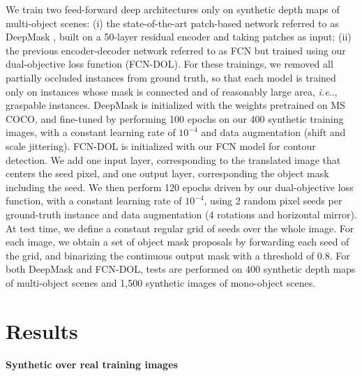 \documentclass[runningheads,a4paper]{llncs}
\makeatletter
\DeclareRobustCommand\onedot{\futurelet\@let@token\@onedot}
\newcommand*\@onedot{\ifx\@let@token.\else.\null\fi\xspace}
\newcommand*\ie{\emph{i.e}\onedot} \newcommand*\Ie{\emph{I.e}\onedot}
\makeatother
\begin{document}
We train two feed-forward deep architectures only on synthetic depth maps of multi-object scenes: (i) the state-of-the-art patch-based network referred to as DeepMask \cite{SharpMask}, built on a 50-layer residual encoder \cite{HeZRS16} and taking patches as input; (ii) the previous encoder-decoder network referred to as FCN \cite{Yang2016CEDN} but trained using our dual-objective loss function (FCN-DOL). For these trainings, we removed all partially occluded instances from ground truth, so that each model is trained only on instances whose mask is connected and of reasonably large area, \ie, graspable instances. DeepMask is initialized with the weights pretrained on MS COCO, and fine-tuned by performing 100 epochs on our 400 synthetic training images, with a constant learning rate of $10^{-4}$ and data augmentation (shift and scale jittering). FCN-DOL is initialized with our FCN model for contour detection. We add one input layer, corresponding to the translated image that centers the seed pixel, and one output layer, corresponding the object mask including the seed. We then perform 120 epochs driven by our dual-objective loss function, with a constant learning rate of $10^{-4}$, using 2 random pixel seeds per ground-truth instance and data augmentation (4 rotations and horizontal mirror). At test time, we define a constant regular grid of seeds over the whole image. For each image, we obtain a set of object mask proposals by forwarding each seed of the grid, and binarizing the continuous output mask with a threshold of 0.8. For both DeepMask and FCN-DOL, tests are performed on 400 synthetic depth maps of multi-object scenes and 1,500 synthetic images of mono-object scenes.


\section{Results}
\label{sec:results}

\paragraph{Synthetic over real training images}
\end{document}
